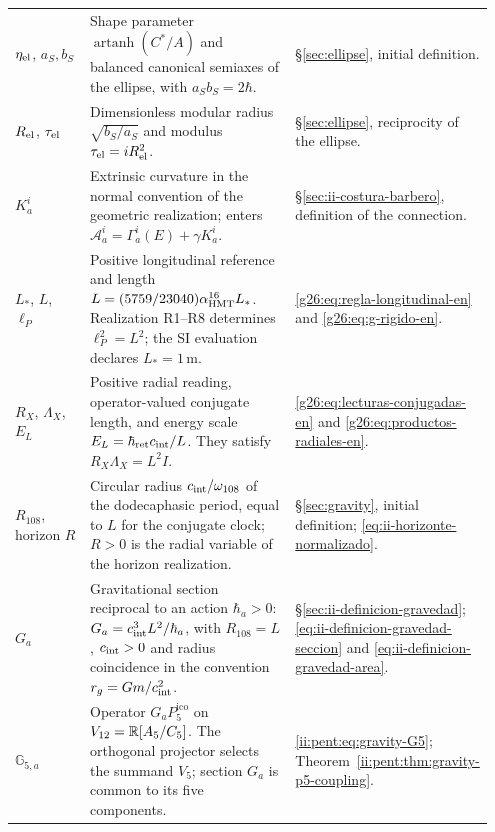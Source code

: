 \begin{longtable}{@{}>{\raggedright\arraybackslash}p{0.19\linewidth}
                    >{\raggedright\arraybackslash}p{0.49\linewidth}
                    >{\raggedright\arraybackslash}p{0.27\linewidth}@{}}
\(\eta_{\rm el}\), \(a_S,b_S\)
& Shape parameter \(\operatorname{artanh}(C^*/A)\) and
  balanced canonical semiaxes of the ellipse, with
  \(a_Sb_S=2\hbar\).
& \S\ref{sec:ellipse}, initial definition.\\[3pt]

\(R_{\rm el}\), \(\tau_{\rm el}\)
& Dimensionless modular radius \(\sqrt{b_S/a_S}\) and modulus
  \(\tau_{\rm el}=iR_{\rm el}^2\).
& \S\ref{sec:ellipse}, reciprocity of the ellipse.\\[3pt]

\(K_a^i\)
& Extrinsic curvature in the normal convention of the geometric
  realization; enters
  \(\mathcal A_a^i=\Gamma_a^i(E)+\gamma K_a^i\).
& \S\ref{sec:ii-costura-barbero}, definition of the connection.\\[3pt]

\(L_*\), \(L\), \(\ell_P\)
& Positive longitudinal reference and length
  \(L=(5759/23040)\alpha_{\mathrm{HMT}}^{16}L_*\).
  Realization R1--R8 determines \(\ell_P^2=L^2\);
  the SI evaluation declares \(L_*=1\,\mathrm m\).
& \eqref{g26:eq:regla-longitudinal-en} and
  \eqref{g26:eq:g-rigido-en}.\\[3pt]

\(R_X\), \(\Lambda_X\), \(E_L\)
& Positive radial reading, operator-valued conjugate length, and
  energy scale \(E_L=\hbar_{\rm ret}c_{\rm int}/L\).
  They satisfy \(R_X\Lambda_X=L^2I\).
& \eqref{g26:eq:lecturas-conjugadas-en} and
  \eqref{g26:eq:productos-radiales-en}.\\[3pt]

\(R_{108}\), horizon \(R\)
& Circular radius \(c_{\rm int}/\omega_{108}\) of the dodecaphasic
  period, equal to \(L\) for the conjugate clock;
  \(R>0\) is the radial variable of the horizon
  realization.
& \S\ref{sec:gravity}, initial definition;
  \eqref{eq:ii-horizonte-normalizado}.\\[3pt]

\(G_a\)
& Gravitational section reciprocal to an action \(\hbar_a>0\):
  \(G_a=c_{\rm int}^{3}L^{2}/\hbar_a\), with \(R_{108}=L\),
  \(c_{\rm int}>0\) and radius coincidence in the convention
  \(r_g=Gm/c_{\rm int}^{2}\).
& \S\ref{sec:ii-definicion-gravedad};
  \eqref{eq:ii-definicion-gravedad-seccion} and
  \eqref{eq:ii-definicion-gravedad-area}.\\[3pt]

\(\mathbb G_{5,a}\)
& Operator \(G_aP^{\mathrm{ico}}_5\) on
  \(V_{12}=\mathbb R[A_5/C_5]\). The orthogonal projector selects
  the summand \(V_5\); section \(G_a\) is common to its five
  components.
& \eqref{ii:pent:eq:gravity-G5};
  Theorem~\ref{ii:pent:thm:gravity-p5-coupling}.\\[3pt]


\end{longtable}
